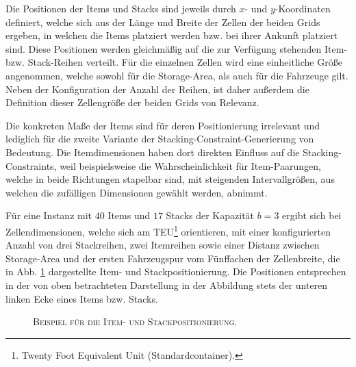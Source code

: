 Die Positionen der Items und Stacks sind jeweils durch $x$- und $y$-Koordinaten definiert,
welche sich aus der Länge und Breite der Zellen der beiden Grids ergeben, in welchen die Items platziert werden
bzw. bei ihrer Ankunft platziert sind. Diese Positionen werden gleichmäßig auf die zur Verfügung stehenden
Item- bzw. Stack-Reihen verteilt. Für die einzelnen Zellen wird eine einheitliche Größe angenommen,
welche sowohl für die Storage-Area, als auch für die Fahrzeuge gilt. Neben der Konfiguration der Anzahl der Reihen,
ist daher außerdem die Definition dieser Zellengröße der beiden Grids von Relevanz.

Die konkreten Maße der Items sind für deren Positionierung irrelevant und lediglich für
die zweite Variante der Stacking-Constraint-Generierung von Bedeutung.
Die Itemdimensionen haben dort direkten Einfluss auf die Stacking-Constraints,
weil beispielsweise die Wahrscheinlichkeit für Item-Paarungen, welche in beide Richtungen stapelbar sind,
mit steigenden Intervallgrößen, aus welchen die zufälligen Dimensionen gewählt werden, abnimmt.

Für eine Instanz mit $40$ Items und $17$ Stacks der Kapazität $b = 3$ ergibt sich bei
Zellendimensionen, welche sich am TEU\footnote{Twenty Foot Equivalent Unit (Standardcontainer).} orientieren,
mit einer konfigurierten Anzahl von drei Stackreihen,
zwei Itemreihen sowie einer Distanz zwischen Storage-Area und der ersten Fahrzeugspur vom Fünffachen
der Zellenbreite, die in Abb. \ref{fig:positioning_example} dargestellte Item- und Stackpositionierung.
Die Positionen entsprechen in der von oben betrachteten Darstellung in der Abbildung stets der unteren linken Ecke
eines Items bzw. Stacks.

\vfill
\pagebreak

\begin{figure}[H]
\centering
{}
\caption{\textsc{Beispiel für die Item- und Stackpositionierung.}}
\label{fig:positioning_example}
\end{figure}

